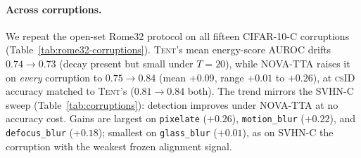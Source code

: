 \documentclass[11pt]{article}
\newcommand{\csid}{\textsc{cs}ID}
\newcommand{\method}[1]{\textsc{#1}}
\begin{document}
\paragraph{Across corruptions.} We repeat the open-set Rome32 protocol on
all fifteen CIFAR-10-C corruptions (Table~\ref{tab:rome32-corruptions}).
\method{Tent}'s mean energy-score AUROC drifts $0.74\!\to\!0.73$ (decay
present but small under $T{=}20$), while \method{NOVA-TTA} raises it on
\emph{every} corruption to $0.75\!\to\!0.84$ (mean $+0.09$, range $+0.01$
to $+0.26$), at \csid{} accuracy matched to \method{Tent}'s ($0.81\!\to\!0.84$
both). The trend mirrors the SVHN-C sweep (Table~\ref{tab:corruptions}):
detection improves under \method{NOVA-TTA} at no accuracy cost. Gains are
largest on \texttt{pixelate} ($+0.26$), \texttt{motion\_blur} ($+0.22$),
and \texttt{defocus\_blur} ($+0.18$); smallest on \texttt{glass\_blur}
($+0.01$), as on SVHN-C the corruption with the weakest frozen alignment
signal.
\end{document}

